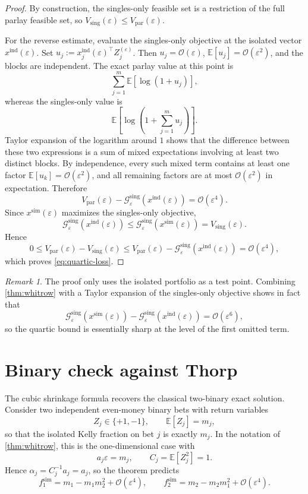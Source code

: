 \documentclass[11pt]{article}
\numberwithin{equation}{section}
\theoremstyle{remark}
\newtheorem{remark}[theorem]{Remark}
\theoremstyle{definition}
\newcommand{\E}{\mathbb{E}}
\newcommand{\1}{\mathbf{1}}
\newcommand{\OO}{\mathcal{O}}
\newcommand{\eps}{\varepsilon}
\newcommand{\ind}{\mathrm{ind}}
\newcommand{\simu}{\mathrm{sim}}
\newcommand{\parlay}{\mathrm{par}}
\newcommand{\sing}{\mathrm{sing}}
\begin{document}
\begin{proof}
By construction, the singles-only feasible set is a restriction of the full parlay feasible set, so $V_\sing(\eps)\le V_\parlay(\eps)$.

For the reverse estimate, evaluate the singles-only objective at the isolated vector $x^{\ind}(\eps)$. Set $u_j:=x_j^{\ind}(\eps)^\top Z_j^{(\eps)}$. Then $u_j=\OO(\eps)$, $\E[u_j]=\OO(\eps^2)$, and the blocks are independent. The exact parlay value at this point is
\[
  \sum_{j=1}^m \E[\log(1+u_j)],
\]
whereas the singles-only value is
\[
  \E\left[\log\left(1+\sum_{j=1}^m u_j\right)\right].
\]
Taylor expansion of the logarithm around $1$ shows that the difference between these two expressions is a sum of mixed expectations involving at least two distinct blocks. By independence, every such mixed term contains at least one factor $\E[u_k]=\OO(\eps^2)$, and all remaining factors are at most $\OO(\eps^2)$ in expectation. Therefore
\begin{equation}
  V_\parlay(\eps)-\mathcal G_{\eps}^{\sing}(x^{\ind}(\eps))=\OO(\eps^4).
  \label{eq:quartic-at-isolated}
\end{equation}
Since $x^{\simu}(\eps)$ maximizes the singles-only objective,
\[
  \mathcal G_{\eps}^{\sing}(x^{\ind}(\eps))
  \le
  \mathcal G_{\eps}^{\sing}(x^{\simu}(\eps))
  =V_\sing(\eps).
\]
Hence
\[
  0\le V_\parlay(\eps)-V_\sing(\eps)
  \le V_\parlay(\eps)-\mathcal G_{\eps}^{\sing}(x^{\ind}(\eps))
  =\OO(\eps^4),
\]
which proves \eqref{eq:quartic-loss}.
\end{proof}

\begin{remark}
The proof only uses the isolated portfolio as a test point. Combining \cref{thm:whitrow} with a Taylor expansion of the singles-only objective shows in fact that
\[
  \mathcal G_{\eps}^{\sing}(x^{\simu}(\eps))
  -\mathcal G_{\eps}^{\sing}(x^{\ind}(\eps))
  =\OO(\eps^6),
\]
so the quartic bound is essentially sharp at the level of the first omitted term.
\end{remark}

\section{Binary check against Thorp}
The cubic shrinkage formula recovers the classical two-binary exact solution. Consider two independent even-money binary bets with return variables
\[
  Z_j\in\{+1,-1\},
  \qquad
  \E[Z_j]=m_j,
\]
so that the isolated Kelly fraction on bet $j$ is exactly $m_j$. In the notation of \cref{thm:whitrow}, this is the one-dimensional case with
\[
  a_j\eps=m_j,\qquad C_j=\E[Z_j^2]=1.
\]
Hence $\alpha_j=C_j^{-1}a_j=a_j$, so the theorem predicts
\[
  f_1^{\simu}=m_1-m_1m_2^2+\OO(\eps^4),
  \qquad
  f_2^{\simu}=m_2-m_2m_1^2+\OO(\eps^4).
\]
\end{document}
